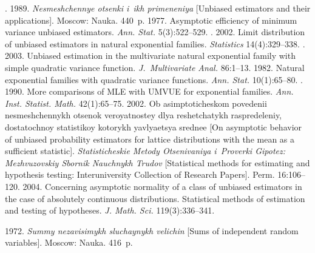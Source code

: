   \begin{multicols}{2}

\renewcommand{\bibname}{\protect\rmfamily References}

{\small\frenchspacing
 {%
 \begin{thebibliography}{99}
. 1989.
\textit{Nesmeshchennye otsenki i~ikh primeneniya}
 [Unbiased estimators and their applications].
 Moscow: Nauka. 440~p. \emph{ }
 1977.
 Asymptotic efficiency of minimum variance unbiased estimators.
\textit{Ann. Stat.} 5(3):522--529.
. 2002.
 Limit distribution of unbiased estimators in natural exponential families.
\textit{Statistics} 14(4):329--338.
. 2003.
 Unbiased estimation in the multivariate natural exponential family with simple quadratic variance function.
\textit{J.~Multivariate Anal.} 86:1--13.
 1982.
 Natural exponential families with quadratic variance functions.
\textit{Ann. Stat.} 10(1):65--80.
. 1990.
 More comparisons of MLE with UMVUE for exponential families.
\textit{Ann. Inst. Statist. Math.} 42(1):65--75.
 2002.
 Ob asimptoticheskom povedenii nesmeshchennykh otsenok veroyatnostey dlya reshetchatykh raspredeleniy,
 dostatochnoy statistikoy kotorykh yavlyaetsya srednee
 [On asymptotic behavior of unbiased probability estimators for lattice distributions with the mean
 as a sufficient statistic].
\textit{Statisticheskie Metody Otsenivaniya i~Proverki Gipotez: 
Mezhvuzovskiy Sbornik Nauchnykh Trudov}
[Statistical methods for estimating and hypothesis
 testing: Interuniversity Collection of Research Papers].
 Perm. 16:106--120.
 2004.
 Concerning asymptotic normality of a class of unbiased estimators in the case of absolutely continuous
 distributions. Statistical methods of estimation and testing of hypotheses.
\textit{J. Math. Sci.} 119(3):336--341.



 1972.
\textit{Summy nezavisimykh sluchaynykh velichin}
 [Sums of independent random variables].
 Moscow: Nauka. 416~p.
 

\end{thebibliography}}}
\end{multicols}
